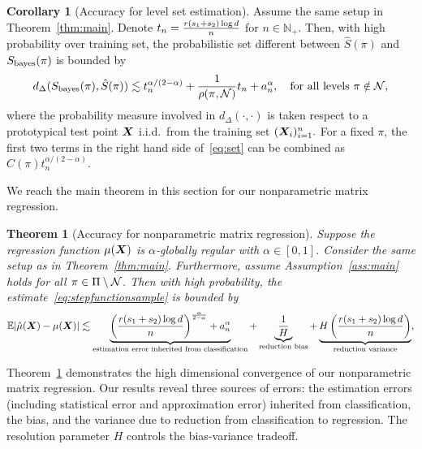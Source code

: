\documentclass[11pt]{article}
\newcommand*{\KeepStyleUnderBrace}[1]{%
\mathop{%
\mathchoice
{\underbrace{\displaystyle#1}}%
{\underbrace{\textstyle#1}}%
{\underbrace{\scriptstyle#1}}%
{\underbrace{\scriptscriptstyle#1}}%
}\limits
}
\theoremstyle{plain}
\newtheorem{thm}{Theorem}
\theoremstyle{definition}
\newtheorem{corollary}{Corollary}
\def\bayesS{S_{\textup{bayes}}}
\begin{document}
\begin{corollary}[Accuracy for level set estimation]\label{thm:level}
Assume the same setup in Theorem~\ref{thm:main}. Denote $t_n={ r(s_1+s_2)\log d  \over n}$ for $n\in\mathbb{N}_{+}$. Then, with high probability over training set, the probabilistic set different between $\hat S(\pi)$ and $\bayesS(\pi)$ is bounded by 
\begin{equation}\label{eq:set}
d_{\Delta}(\bayesS(\pi),\hat S(\pi))\lesssim t_n^{\alpha/(2-\alpha)}+ {1\over \rho(\pi,\tN)}t_n+a^\alpha_n, \quad \text{for all levels }\pi \notin \tN, 
\end{equation}
where the probability measure involved in $d_\Delta(\cdot,\cdot)$ is taken respect to a prototypical test point $\bm X$ i.i.d.\ from the training set $(\bm X_i)_{i=1}^n.$ For a fixed $\pi$, the first two terms in the right hand side of~\eqref{eq:set} can be combined as $C(\pi)t^{\alpha/(2-\alpha)}_n$. 
\end{corollary}

We reach the main theorem in this section for our nonparametric matrix regression. 

\begin{thm}[Accuracy for nonparametric matrix regression]\label{thm:regression} Suppose the regression function $\mu(\bm X)$ is $\alpha$-globally regular with $\alpha\in[0,1]$. Consider the same setup as in Theorem~\ref{thm:main}. Furthermore, assume Assumption~\ref{ass:main} holds for all $\pi\in\Pi\setminus \mathcal{N}$. Then with high probability, the estimate~\eqref{eq:stepfunctionsample} is bounded by
\[
\mathbb{E}|\hat \mu(\mX)- \mu(\mX)| \lesssim   \KeepStyleUnderBrace{\left({r(s_1+s_2)\log d\over n}\right)^{\alpha \over 2-\alpha}+a^\alpha_n}_{\text{estimation error inherited from classification}}+\KeepStyleUnderBrace{1\over H}_{\text{reduction bias}}+\KeepStyleUnderBrace{H\left({r(s_1+s_2)\log d\over n}\right)}_{\text{reduction variance}},
\]

\end{thm}

Theorem~\ref{thm:regression} demonstrates the high dimensional convergence of our nonparametric matrix regression. Our results reveal three sources of errors: the estimation errors (including statistical error and approximation error) inherited from classification, the bias, and the variance due to reduction from classification to regression. The resolution parameter $H$ controls the bias-variance tradeoff. 
\end{document}
